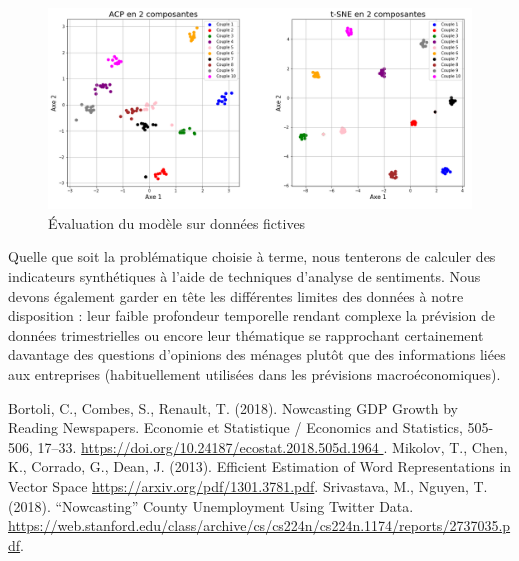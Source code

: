\documentclass[11pt,french,french]{article}
\begin{document}
\begin{figure}
\centering
\includegraphics[width=1\textwidth]{figures.png}
\captionsetup{margin=0cm,format=hang,justification=justified}
\caption{Évaluation du modèle sur données fictives}\label{fig:figure_evaluation}
\end{figure}

Quelle que soit la problématique choisie à terme, nous tenterons de
calculer des indicateurs synthétiques à l'aide de techniques d'analyse
de sentiments. Nous devons également garder en tête les différentes
limites des données à notre disposition : leur faible profondeur
temporelle rendant complexe la prévision de données trimestrielles ou
encore leur thématique se rapprochant certainement davantage des
questions d'opinions des ménages plutôt que des informations liées aux
entreprises (habituellement utilisées dans les prévisions
macroéconomiques).

\nocite{*}

\begin{thebibliography}{999}
 Bortoli, C., Combes, S., Renault, T. (2018). Nowcasting GDP Growth by Reading Newspapers. Economie et Statistique / Economics and Statistics, 505-506, 17–33. \url{https://doi.org/10.24187/ecostat.2018.505d.1964 }.
Mikolov, T.,  Chen, K., Corrado, G., Dean, J. (2013). Efficient Estimation of Word Representations in Vector Space \url{https://arxiv.org/pdf/1301.3781.pdf}.
Srivastava, M., Nguyen, T. (2018). “Nowcasting” County Unemployment Using Twitter Data. \url{https://web.stanford.edu/class/archive/cs/cs224n/cs224n.1174/reports/2737035.pdf}.
\end{thebibliography}
\end{document}
